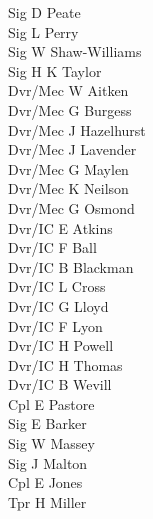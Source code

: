 \begin{multicols}{3}
  Sig D Peate \\
  Sig L Perry \\
  Sig W Shaw-Williams \\
  Sig H K Taylor \\
  Dvr/Mec W Aitken \\
  Dvr/Mec G Burgess \\
  Dvr/Mec J Hazelhurst \\
  Dvr/Mec J Lavender \\
  Dvr/Mec G Maylen \\
  Dvr/Mec K Neilson \\
  Dvr/Mec G Osmond \\
  Dvr/IC E Atkins \\
  Dvr/IC F Ball \\
  Dvr/IC B Blackman \\
  Dvr/IC L Cross \\
  Dvr/IC G Lloyd \\
  Dvr/IC F Lyon \\
  Dvr/IC H Powell \\
  Dvr/IC H Thomas \\
  Dvr/IC B Wevill \\
  Cpl E Pastore \\
  Sig E Barker \\
  Sig W Massey \\
  Sig J Malton \\
  Cpl E Jones \\
  Tpr H Miller \\
\end{multicols}

